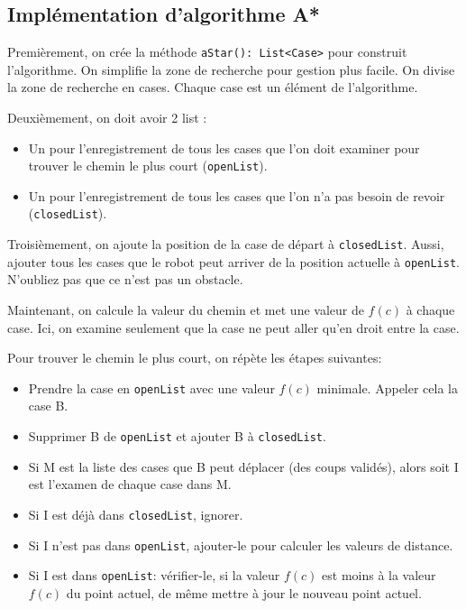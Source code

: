 \documentclass[12pt, pdflatex]{article}
\begin{document}
    \subsection{Implémentation d'algorithme A*}
    Premièrement, on crée la méthode \texttt{aStar(): List<Case>} pour construit l'algorithme. On simplifie la zone de recherche pour gestion plus facile. On divise la zone de recherche en cases. Chaque case est un élément de l'algorithme.

    Deuxièmement, on doit avoir 2 list :
    \begin{itemize}
        \item Un pour l'enregistrement de tous les cases que l'on doit examiner pour trouver le chemin le plus court (\texttt{openList}).
        \item Un pour l'enregistrement de tous les cases que l'on n'a pas besoin de revoir (\texttt{closedList}).
    \end{itemize} 
    
    Troisièmement, on ajoute la position de la case de départ à \texttt{closedList}. Aussi, ajouter tous les cases que le robot peut arriver de la position actuelle à \texttt{openList}. N'oubliez pas que ce n'est pas un obstacle.

    Maintenant, on calcule la valeur du chemin et met une valeur de $f(c)$ à chaque case. Ici, on examine seulement que la case ne peut aller qu'en droit entre la case.

    Pour trouver le chemin le plus court, on répète les étapes suivantes: 
    \begin{itemize}
        \item Prendre la case en \texttt{openList} avec une valeur $f(c)$ minimale. Appeler cela la case B.
        \item Supprimer B de \texttt{openList} et ajouter B à \texttt{closedList}.
        \item Si M est la liste des cases que B peut déplacer (des coups validés), alors soit I est l'examen de chaque case dans M.
        \item Si I est déjà dans \texttt{closedList}, ignorer.
        \item Si I n'est pas dans \texttt{openList}, ajouter-le pour calculer les valeurs de distance.
        \item Si I est dans \texttt{openList}: vérifier-le, si la valeur $f(c)$ est moins à la valeur $f(c)$ du point actuel, de même mettre à jour le nouveau point actuel.
    \end{itemize}
\end{document}
